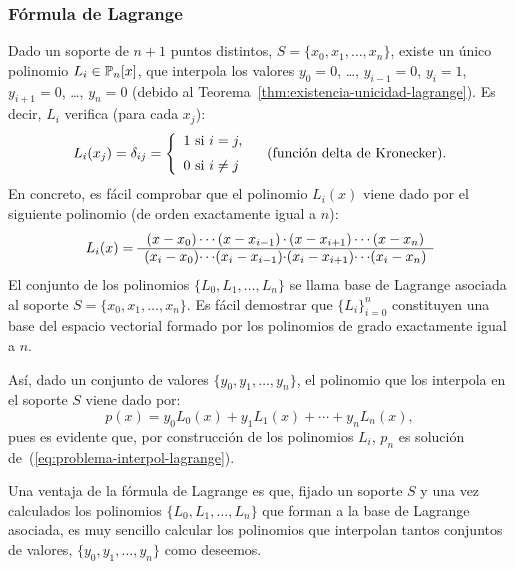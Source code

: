 \subsubsection{Fórmula de Lagrange}
Dado un soporte de $n+1$ puntos distintos, $S=\{x_0,x_1,\dots,x_n\}$,
existe un único polinomio $L_i\in \operatorname{{\mathbb P}}_n[x]$, que interpola los
valores $y_0=0$, \dots, $y_{i-1}=0$, $y_i=1$, $y_{i+1}=0$, \dots,
$y_n=0$ (debido al Teorema~\ref{thm:existencia-unicidad-lagrange}). Es
decir, $L_i$ verifica (para cada $x_j$):
\begin{equation}
  L_i(x_j)= \delta_{ij} = 
  \left\{\begin{array}{l}
      1 \text{ si } i=j, \\\noalign{\medskip} 0 \text{ si } i\neq j
    \end{array}\right. \quad \text{(función delta de Kronecker).}
\end{equation}
En concreto, es fácil comprobar que el polinomio $L_i(x)$ viene dado
por el siguiente polinomio (de orden exactamente igual a $n$):
\begin{equation}
  L_i(x)=
  \begin{array}{c@{}c@{}c@{}c@{}c@{}c@{}c}
    (x-x_0) & \cdots & (x-x_{i-1}) & \cdot & (x-x_{i+1}) & \cdots &
    (x-x_n)
  \\ \hline
    (x_i-x_0) & \cdots & (x_i-x_{i-1}) & \cdot & (x_i-x_{i+1}) & \cdots &
    (x_i-x_n)
  \end{array}
\end{equation}
El conjunto de los polinomios $\{ L_0, L_1,\dots, L_n \}$ se llama
base de Lagrange asociada al soporte $S=\{x_0,x_1,\dots,x_n\}$.  Es
fácil demostrar que $\{L_i\}_{i=0}^n$ constituyen una base del espacio
vectorial formado por los polinomios de grado exactamente igual a
$n$.

Así, dado un conjunto de valores $\{y_0,y_1,\dots,y_n\}$, el polinomio
que los interpola en el soporte $S$ viene dado por:
\begin{equation}
  p(x)= y_0L_0(x) + y_1 L_1(x) + \cdots + y_n L_n(x),
\end{equation}
pues es evidente que, por construcción de los polinomios $L_i$, 
$p_n$ es solución de~(\ref{eq:problema-interpol-lagrange}).

\begin{remark}
  Una ventaja de la fórmula de Lagrange es que, fijado un soporte $S$
  y una vez calculados los polinomios $\{L_0,L_1,\dots, L_n\}$ que
  forman a la base de Lagrange asociada, es muy sencillo calcular los
  polinomios que interpolan tantos conjuntos de valores,
  $\{y_0,y_1,\dots,y_n\}$ como deseemos. 
\end{remark}

